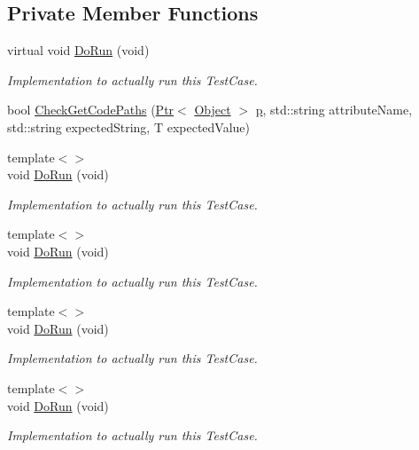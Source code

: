 \subsection*{Private Member Functions}
\begin{DoxyCompactItemize}
\item 
virtual void \hyperlink{classAttributeTestCase_a1f9b2b4dc76018a1185930e93f14eabc}{Do\+Run} (void)
\begin{DoxyCompactList}\small\item\em Implementation to actually run this Test\+Case. \end{DoxyCompactList}\item 
bool \hyperlink{classAttributeTestCase_a902fb84c803f1c898329f9263575331e}{Check\+Get\+Code\+Paths} (\hyperlink{classns3_1_1Ptr}{Ptr}$<$ \hyperlink{classns3_1_1Object}{Object} $>$ \hyperlink{lte__link__budget__x2__handover__measures_8m_ac9de518908a968428863f829398a4e62}{p}, std\+::string attribute\+Name, std\+::string expected\+String, T expected\+Value)
\item 
{\footnotesize template$<$$>$ }\\void \hyperlink{classAttributeTestCase_a97ae2f6fdcbf9ae34b5fa99afc3d8020}{Do\+Run} (void)
\begin{DoxyCompactList}\small\item\em Implementation to actually run this Test\+Case. \end{DoxyCompactList}\item 
{\footnotesize template$<$$>$ }\\void \hyperlink{classAttributeTestCase_a4adcecce93540fe690d41ca31b7caf84}{Do\+Run} (void)
\begin{DoxyCompactList}\small\item\em Implementation to actually run this Test\+Case. \end{DoxyCompactList}\item 
{\footnotesize template$<$$>$ }\\void \hyperlink{classAttributeTestCase_a6d3d7e57a039d2caa29714375dbfeee0}{Do\+Run} (void)
\begin{DoxyCompactList}\small\item\em Implementation to actually run this Test\+Case. \end{DoxyCompactList}\item 
{\footnotesize template$<$$>$ }\\void \hyperlink{classAttributeTestCase_a5a76e20a736ed54bdd81fa2c5960dd51}{Do\+Run} (void)
\begin{DoxyCompactList}\small\item\em Implementation to actually run this Test\+Case. \end{DoxyCompactList}\item 

\end{DoxyCompactItemize}
